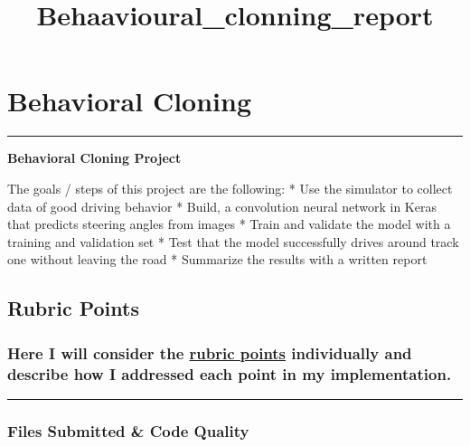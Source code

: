 \documentclass[11pt]{article}
\title{Behaavioural\_clonning\_report}
\begin{document}
    
    
    \maketitle
    
    

    
    \hypertarget{behavioral-cloning}{%
\section{\texorpdfstring{\textbf{Behavioral
Cloning}}{Behavioral Cloning}}\label{behavioral-cloning}}

\begin{center}\rule{0.5\linewidth}{\linethickness}\end{center}

\textbf{Behavioral Cloning Project}

The goals / steps of this project are the following: * Use the simulator
to collect data of good driving behavior * Build, a convolution neural
network in Keras that predicts steering angles from images * Train and
validate the model with a training and validation set * Test that the
model successfully drives around track one without leaving the road *
Summarize the results with a written report

\hypertarget{rubric-points}{%
\subsection{Rubric Points}\label{rubric-points}}

\hypertarget{here-i-will-consider-the-rubric-points-individually-and-describe-how-i-addressed-each-point-in-my-implementation.}{%
\subsubsection{\texorpdfstring{Here I will consider the
\href{https://review.udacity.com/\#!/rubrics/432/view}{rubric points}
individually and describe how I addressed each point in my
implementation.}{Here I will consider the rubric points individually and describe how I addressed each point in my implementation.}}\label{here-i-will-consider-the-rubric-points-individually-and-describe-how-i-addressed-each-point-in-my-implementation.}}

\begin{center}\rule{0.5\linewidth}{\linethickness}\end{center}

\hypertarget{files-submitted-code-quality}{%
\subsubsection{Files Submitted \& Code
Quality}\label{files-submitted-code-quality}}
\end{document}
